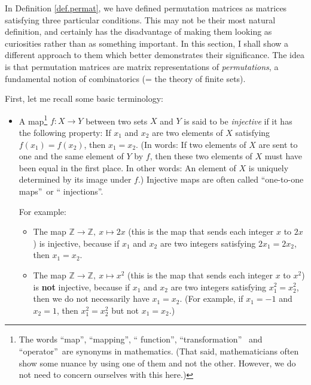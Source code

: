 \documentclass[numbers=enddot,12pt,final,onecolumn,notitlepage]{scrartcl}%
\theoremstyle{definition}
\begin{document}
In Definition \ref{def.permat}, we have defined permutation matrices as
matrices satisfying three particular conditions. This may not be their most
natural definition, and certainly has the disadvantage of making them looking
as curiosities rather than as something important. In this section, I shall
show a different approach to them which better demonstrates their
significance. The idea is that permutation matrices are matrix representations
of \textit{permutations}, a fundamental notion of combinatorics (= the theory
of finite sets).

First, let me recall some basic terminology:

\begin{itemize}
\item A map\footnote{The words \textquotedblleft map\textquotedblright,
\textquotedblleft mapping\textquotedblright, \textquotedblleft
function\textquotedblright, \textquotedblleft transformation\textquotedblright%
\ and \textquotedblleft operator\textquotedblright\ are synonyms in
mathematics. (That said, mathematicians often show some nuance by using one of
them and not the other. However, we do not need to concern ourselves with this
here.)} $f:X\rightarrow Y$ between two sets $X$ and $Y$ is said to be
\textit{injective} if it has the following property: If $x_{1}$ and $x_{2}$
are two elements of $X$ satisfying $f\left(  x_{1}\right)  =f\left(
x_{2}\right)  $, then $x_{1}=x_{2}$. (In words: If two elements of $X$ are
sent to one and the same element of $Y$ by $f$, then these two elements of $X$
must have been equal in the first place. In other words: An element of $X$ is
uniquely determined by its image under $f$.) Injective maps are often called
\textquotedblleft one-to-one maps\textquotedblright\ or \textquotedblleft
injections\textquotedblright.

For example:

\begin{itemize}
\item The map $\mathbb{Z}\rightarrow\mathbb{Z},\ x\mapsto2x$ (this is the map
that sends each integer $x$ to $2x$) is injective, because if $x_{1}$ and
$x_{2}$ are two integers satisfying $2x_{1}=2x_{2}$, then $x_{1}=x_{2}$.

\item The map $\mathbb{Z}\rightarrow\mathbb{Z},\ x\mapsto x^{2}$ (this is the
map that sends each integer $x$ to $x^{2}$) is \textbf{not} injective, because
if $x_{1}$ and $x_{2}$ are two integers satisfying $x_{1}^{2}=x_{2}^{2}$, then
we do not necessarily have $x_{1}=x_{2}$. (For example, if $x_{1}=-1$ and
$x_{2}=1$, then $x_{1}^{2}=x_{2}^{2}$ but not $x_{1}=x_{2}$.)
\end{itemize}


\end{itemize}
\end{document}
